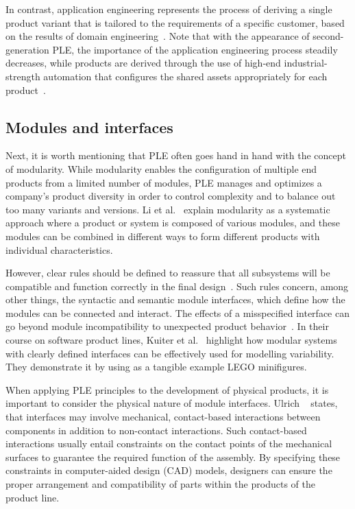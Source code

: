 \documentclass[sigconf,review]{acmart}
\begin{document}
In contrast, application engineering represents the process of deriving a single product variant that is tailored to the requirements of a specific customer, based on the results of domain engineering~\cite{Kästner_2013}. 
Note that with the appearance of second-generation PLE, the importance of the application engineering process steadily decreases, while products are derived through the use of high-end industrial-strength automation that configures the shared assets appropriately for each product~\cite{Krueger_2013}.

\subsection{Modules and interfaces}
\label{sec:modules}

Next, it is worth mentioning that PLE often goes hand in hand with the concept of modularity.
While modularity enables the configuration of multiple end products from a limited number of modules, PLE manages and optimizes a company's product diversity in order to control complexity and to balance out too many variants and versions.
Li et al.~\cite{Li_2019} explain modularity as a systematic approach where a product or system is composed of various modules, and these modules can be combined in different ways to form different products with individual characteristics.

However, clear rules should be defined to reassure that all subsystems will be compatible and function correctly in the final design~\cite{Baldwin_2003}.
Such rules concern, among other things, the syntactic and semantic module interfaces, which define how the modules can be connected and interact.
The effects of a misspecified interface can go beyond module incompatibility to unexpected product behavior~\cite{Parslov_2015}. 
In their course on software product lines, Kuiter et al.~\cite{Kuiter_2025} highlight how modular systems with clearly defined interfaces can be effectively used for modelling variability. 
They demonstrate it by using as a tangible example LEGO minifigures.  

When applying PLE principles to the development of physical products, it is important to consider the physical nature of module interfaces.
Ulrich ~\cite{Ulrich_1995} states, that interfaces may involve mechanical, contact-based interactions between components in addition to non-contact interactions.
Such contact-based interactions usually entail constraints on the contact points of the mechanical surfaces to guarantee the required function of the assembly.
By specifying these constraints in computer-aided design (CAD) models, designers can ensure the proper arrangement and compatibility of parts within the products of the product line.
\end{document}
